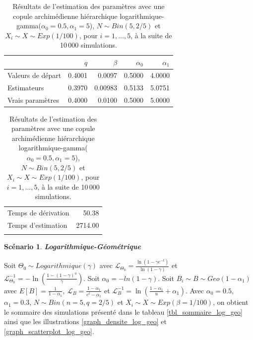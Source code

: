 \documentclass{article}
\newtheorem{Scenario}{Scénario}
\begin{document}
		\begin{table}[H]
			\centering
			\begin{tabular}{lrrrr}
				\hline
				& $q$ & $\beta$ & $\alpha_0$ & $\alpha_1$ \\ 
				\hline
				Valeurs de départ & 0.4001 & 0.0097 & 0.5000 & 4.0000 \\ 
				Estimateurs & 0.3970  &0.00983 & 0.5133 &  5.0751 \\ 
				Vrais paramètres & 0.4000 & 0.0100 & 0.5000 & 5.0000 \\
				\hline
			\end{tabular}
			\begin{tabular}{lr}
				\hline
				&  \\ 
				\hline
				Temps de dérivation & 50.38  \\ 
				Temps d'estimation & 2714.00 \\ 
				\\
				\hline
			\end{tabular}
			\caption[Résultats du scénario \ref{scenario_log_gamma}]{Résultats de l'estimation des paramètres avec une copule archimédienne hiérarchique logarithmique-gamma($\alpha_0=0.5, \alpha_1=5$), $N \sim Bin(5, 2/5)$ et $X_i \sim X \sim Exp(1/100)$, pour $i=1,\dots,5$, à la suite de 10\,000 simulations.}
			\label{tbl_resultats_log_gamma}
		\end{table}
	
	
	\begin{Scenario}\label{scenario_log_geo}
		\textbf{Logarithmique-Géométrique}
	\end{Scenario}
	
	Soit $\Theta_0 \sim Logarithmique(\gamma)$ avec $\mathscr{L}_{\Theta_0} = \frac{\ln(1-\gamma e^{-t})}{\ln(1-\gamma)}$ et $\mathscr{L}^{-1}_{\Theta_0} = -\ln \left( \frac{1-(1-\gamma)^u}{\gamma} \right)$. Soit $\alpha_{0} = -ln(1-\gamma)$.
	Soit $B_i \sim B \sim Geo(1-\alpha_1)$ avec $E[B] = \frac{1}{1-\alpha_1},\ \mathscr{L}_{B} = \frac{1-\alpha_1}{e^t-\alpha_1}$ et $\mathscr{L}^{-1}_{B} = \ln\left(\frac{1 - \alpha_1}{u}+\alpha_1\right)$. Avec $\alpha_0 = 0.5$, $\alpha_1 = 0.3$, $N\sim Bin(n=5, q=2/5)$ et $X_i \sim X \sim Exp(\beta = 1/100)$, on obtient le sommaire des simulations présenté dans le tableau \ref{tbl_sommaire_log_geo} ainsi que les illustrations \ref{graph_densite_log_geo} et \ref{graph_scatterplot_log_geo}.
	
\end{document}
